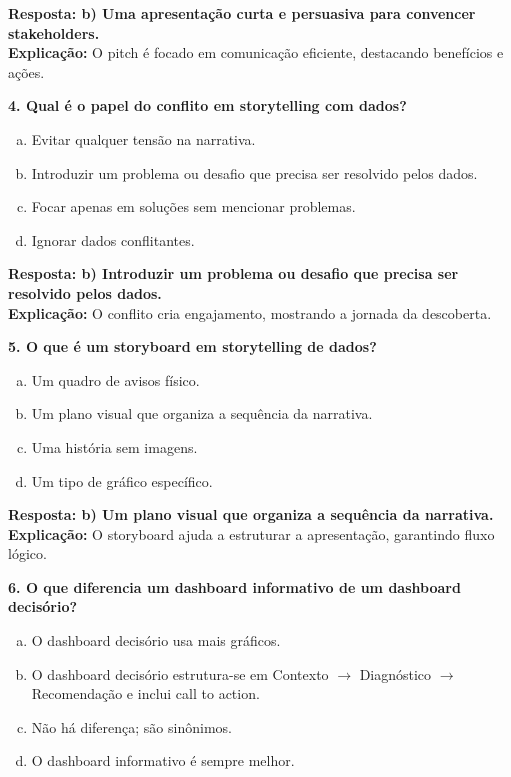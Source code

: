 \begin{SolvedBox}[orange]
\textbf{Resposta: b) Uma apresentação curta e persuasiva para convencer stakeholders.} \\
\textbf{Explicação:} O pitch é focado em comunicação eficiente, destacando benefícios e ações.

\textbf{4. Qual é o papel do conflito em storytelling com dados?}

\begin{enumerate}[a)]
  \item Evitar qualquer tensão na narrativa.
  \item Introduzir um problema ou desafio que precisa ser resolvido pelos dados.
  \item Focar apenas em soluções sem mencionar problemas.
  \item Ignorar dados conflitantes.
\end{enumerate}

\textbf{Resposta: b) Introduzir um problema ou desafio que precisa ser resolvido pelos dados.} \\
\textbf{Explicação:} O conflito cria engajamento, mostrando a jornada da descoberta.

\textbf{5. O que é um storyboard em storytelling de dados?}

\begin{enumerate}[a)]
  \item Um quadro de avisos físico.
  \item Um plano visual que organiza a sequência da narrativa.
  \item Uma história sem imagens.
  \item Um tipo de gráfico específico.
\end{enumerate}

\textbf{Resposta: b) Um plano visual que organiza a sequência da narrativa.} \\
\textbf{Explicação:} O storyboard ajuda a estruturar a apresentação, garantindo fluxo lógico.

\textbf{6. O que diferencia um dashboard informativo de um dashboard decisório?}

\begin{enumerate}[a)]
  \item O dashboard decisório usa mais gráficos.
  \item O dashboard decisório estrutura-se em Contexto $\rightarrow$ Diagnóstico $\rightarrow$ Recomendação e inclui call to action.
  \item Não há diferença; são sinônimos.
  \item O dashboard informativo é sempre melhor.
\end{enumerate}


\end{SolvedBox}
